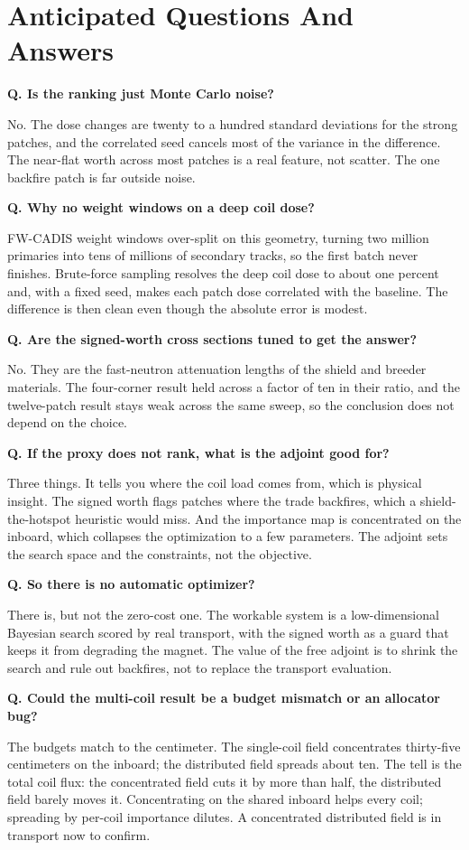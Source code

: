 \documentclass[11pt]{article}
\newcommand{\Q}[1]{\smallskip\noindent\textbf{Q. #1}\par}
\newcommand{\A}[1]{\noindent #1\par}
\begin{document}
\section{Anticipated Questions And Answers}
\Q{Is the ranking just Monte Carlo noise?}
\A{No. The dose changes are twenty to a hundred standard deviations for the strong patches, and the
correlated seed cancels most of the variance in the difference. The near-flat worth across most
patches is a real feature, not scatter. The one backfire patch is far outside noise.}

\Q{Why no weight windows on a deep coil dose?}
\A{FW-CADIS weight windows over-split on this geometry, turning two million primaries into tens of
millions of secondary tracks, so the first batch never finishes. Brute-force sampling resolves the
deep coil dose to about one percent and, with a fixed seed, makes each patch dose correlated with the
baseline. The difference is then clean even though the absolute error is modest.}

\Q{Are the signed-worth cross sections tuned to get the answer?}
\A{No. They are the fast-neutron attenuation lengths of the shield and breeder materials. The
four-corner result held across a factor of ten in their ratio, and the twelve-patch result stays weak
across the same sweep, so the conclusion does not depend on the choice.}

\Q{If the proxy does not rank, what is the adjoint good for?}
\A{Three things. It tells you where the coil load comes from, which is physical insight. The signed
worth flags patches where the trade backfires, which a shield-the-hotspot heuristic would miss. And
the importance map is concentrated on the inboard, which collapses the optimization to a few
parameters. The adjoint sets the search space and the constraints, not the objective.}

\Q{So there is no automatic optimizer?}
\A{There is, but not the zero-cost one. The workable system is a low-dimensional Bayesian search
scored by real transport, with the signed worth as a guard that keeps it from degrading the magnet.
The value of the free adjoint is to shrink the search and rule out backfires, not to replace the
transport evaluation.}

\Q{Could the multi-coil result be a budget mismatch or an allocator bug?}
\A{The budgets match to the centimeter. The single-coil field concentrates thirty-five centimeters on
the inboard; the distributed field spreads about ten. The tell is the total coil flux: the
concentrated field cuts it by more than half, the distributed field barely moves it. Concentrating on
the shared inboard helps every coil; spreading by per-coil importance dilutes. A concentrated
distributed field is in transport now to confirm.}
\end{document}
